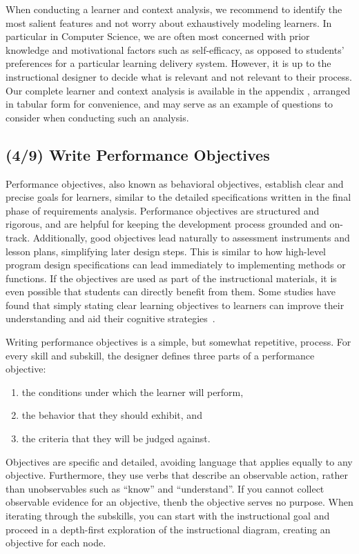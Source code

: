 When conducting a learner and context analysis, we recommend to identify the most salient features and not worry about exhaustively modeling learners.
In particular in Computer Science, we are often most concerned with prior knowledge and motivational factors such as self-efficacy, as opposed to students' preferences for a particular learning delivery system.
However, it is up to the instructional designer to decide what is relevant and not relevant to their process.
Our complete learner and context analysis  is available in the appendix , arranged in tabular form for convenience, and may serve as an example of questions to consider when conducting such an analysis.


\subsection{(4/9) Write Performance Objectives}

Performance objectives, also known as behavioral objectives, establish clear and precise goals for learners, similar to the detailed specifications written in the final phase of requirements analysis.
Performance objectives are structured and rigorous, and are helpful for keeping the development process grounded and on-track.
Additionally, good objectives lead naturally to assessment instruments and lesson plans, simplifying later design steps. This is similar to how high-level program design specifications can lead immediately to implementing methods or functions.
If the objectives are used as part of the instructional materials, it is even possible that students can directly benefit from them.
Some studies have found that simply stating clear learning objectives to learners can improve their understanding and aid their cognitive strategies~\citep{torrance2007assessment}. 

Writing performance objectives is a simple, but somewhat repetitive, process.
For every skill and subskill, the designer defines three parts of a performance objective:
\begin{enumerate}
\item the conditions under which the learner will perform,
\item the behavior that they should exhibit, and
\item the criteria that they will be judged against.
\end{enumerate}
Objectives are specific and detailed, avoiding language that applies equally to any objective.
Furthermore, they use verbs that describe an observable action, rather than unobservables such as ``know'' and ``understand''.
If you cannot collect observable evidence for an objective, thenb the objective serves no purpose.
When iterating through the subskills, you can start with the instructional goal and proceed in a depth-first exploration of the instructional diagram, creating an objective for each node.

